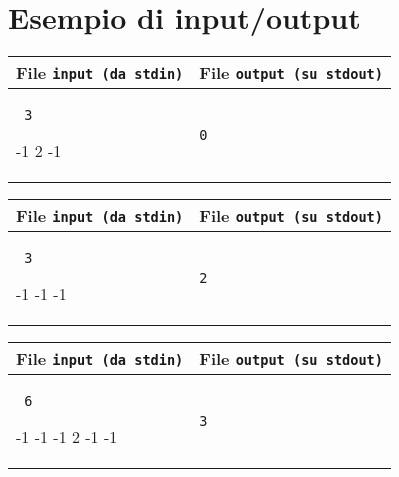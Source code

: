\documentclass[a4paper,11pt]{article}
\newcommand{\file}[1]{\texttt{#1}}
\newcommand{\esempio}[2]{
  \noindent\begin{minipage}{\textwidth}
    \begin{tabular}{|p{11cm}|p{5cm}|}
      \hline
      \textbf{File \file{input (da stdin)}} & \textbf{File \file{output (su stdout)}}\\
      \hline
      \tt \small #1 &
      \tt \small #2 \\
      \hline
    \end{tabular}
  \end{minipage}
}
\begin{document}
\section*{Esempio di input/output}
\setlength{\tabcolsep}{6pt}
\esempio{
3

-1 2 -1
}{0}
  
\esempio{
3

-1 -1 -1
}{2}
  
\esempio{
6

-1 -1 -1 2 -1 -1
}{3}
  
\end{document}
